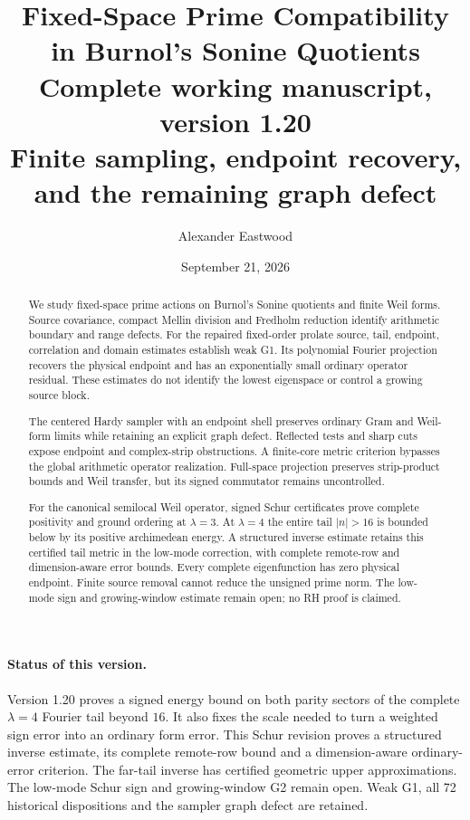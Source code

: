 \documentclass[11pt]{article}
\title{\textbf{Fixed-Space Prime Compatibility in Burnol's Sonine Quotients}\\[5pt]
\large Complete working manuscript, version 1.20\\
\normalsize Finite sampling, endpoint recovery, and the remaining graph defect}
\author{Alexander Eastwood}
\date{September 21, 2026}
\theoremstyle{remark}
\begin{document}
\maketitle
\begin{abstract}
We study fixed-space prime actions on Burnol's Sonine quotients and
finite Weil forms. Source covariance, compact Mellin division and
Fredholm reduction identify arithmetic boundary and range defects.
For the repaired fixed-order prolate source, tail, endpoint, correlation
and domain estimates establish weak G1. Its polynomial Fourier
projection recovers the physical endpoint and has an exponentially
small ordinary operator residual. These estimates do not identify
the lowest eigenspace or control a growing source block.

The centered Hardy sampler with an endpoint shell preserves ordinary
Gram and Weil-form limits while retaining an explicit graph defect.
Reflected tests and sharp cuts expose endpoint and complex-strip
obstructions. A finite-core metric criterion bypasses the global
arithmetic operator realization. Full-space projection preserves
strip-product bounds and Weil transfer, but its signed commutator
remains uncontrolled.

For the canonical semilocal Weil operator, signed Schur certificates
prove complete positivity and ground ordering at $\lambda=3$.
At $\lambda=4$ the entire tail $|n|>16$ is bounded below by its
positive archimedean energy. A structured inverse estimate retains
this certified tail metric in the low-mode correction, with complete
remote-row and dimension-aware error bounds. Every complete
eigenfunction has zero physical endpoint. Finite source removal
cannot reduce the unsigned prime norm. The low-mode sign and
growing-window estimate remain open; no RH proof is claimed.
\end{abstract}

\paragraph{Status of this version.}
Version 1.20 proves a signed energy bound on both parity sectors
of the complete $\lambda=4$ Fourier tail beyond $16$. It also fixes
the scale needed to turn a weighted sign error into an ordinary form
error. This Schur revision proves a structured inverse estimate, its
complete remote-row bound and a dimension-aware ordinary-error criterion.
The far-tail inverse has certified geometric upper approximations.
The low-mode Schur sign and growing-window G2 remain open.
Weak G1, all 72 historical dispositions and the sampler graph defect
are retained.
\end{document}
